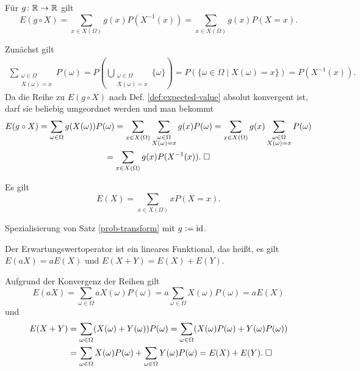 \begin{Satz}\label{prob-transform}
Für $g\colon\mathbb R\to\mathbb R$ gilt
\[E(g\circ X) = \sum_{x\in X(\Omega)} g(x)P(X^{-1}(x))
= \sum_{x\in X(\Omega)} g(x)P(X=x).\]
\end{Satz}
 Zunächst gilt
\begin{gather*}
\sum_{\substack{\omega\in\Omega\\ X(\omega)=x}}P(\omega)
= P(\bigcup_{\substack{\omega\in\Omega\\ X(\omega)=x}} \{\omega\})
= P(\{\omega\in\Omega\mid X(\omega)=x\})
= P(X^{-1}(x)).
\end{gather*}
Da die Reihe zu $E(g\circ X)$ nach Def. \ref{def:expected-value}
absolut konvergent ist, darf sie beliebig umgeordnet werden und
man bekommt
\begin{gather*}
E(g\circ X) = \sum_{\omega\in\Omega}g(X(\omega))P(\omega)
= \sum_{x\in X(\Omega)}\sum_{\substack{\omega\in\Omega\\ X(\omega)=x}} g(x)P(\omega)
= \sum_{x\in X(\Omega)} g(x)\sum_{\substack{\omega\in\Omega\\ X(\omega)=x}}P(\omega)\\
= \sum_{x\in X(\Omega)} g(x)P(X^{-1}(x)).\;\square
\end{gather*}

\begin{Korollar}
Es gilt
\[E(X) = \sum_{x\in X(\Omega)} xP(X=x).\]
\end{Korollar}
\begin{Beweis} Spezialisierung von Satz \ref{prob-transform} mit
$g:=\operatorname{id}$.\,\qedsymbol
\end{Beweis}

\begin{Korollar}\label{expected-value-op-linear}
Der Erwartungswertoperator ist ein lineares Funktional,
das heißt, es gilt $E(aX)=aE(X)$ und $E(X+Y)=E(X)+E(Y)$. 
\end{Korollar}
 Aufgrund der Konvergenz der Reihen gilt
\[E(aX) = \sum_{\omega\in\Omega}aX(\omega)P(\omega)
= a\sum_{\omega\in\Omega}X(\omega)P(\omega) = aE(X)\]
und
\begin{align*}
E(X+Y) &= \sum_{\omega\in\Omega} (X(\omega)+Y(\omega))P(\omega)
= \sum_{\omega\in\Omega} (X(\omega)P(\omega)+Y(\omega)P(\omega))\\
&= \sum_{\omega\in\Omega} X(\omega)P(\omega)
+ \sum_{\omega\in\Omega} Y(\omega)P(\omega) = E(X)+E(Y).\;\square
\end{align*}

